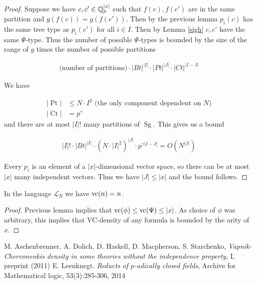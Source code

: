 \documentclass{amsart}
\renewcommand{\LL}{\mathcal L_R}
\DeclareMathOperator{\Sg}{Sg}
\DeclareMathOperator{\Pt}{Pt}
\DeclareMathOperator{\Ct}{Ct}
\begin{document}
\begin{proof}
	Suppose we have $c, c' \in \mathbb{Q}_p^{|x|}$ such that $f(c), f(c')$ are in the same partition and $g(f(c)) = g(f(c'))$.
	Then by the previous lemma $p_i(c)$ has the same tree type as $p_i(c')$ for all $i\in I$.
	Then by Lemma \ref{sigh} $c, c'$ have the same $\Psi$-type.
	Thus the number of possible $\Psi$-types is bounded by the size of the range of $g$ times the number of possible partitions
	
	\begin{align*}
		\text{(number of partitions)} \cdot |Bt|^{|I|} \cdot |Pt|^{|J|} \cdot |Ct|^{|I-J|}
	\end{align*}
	
	We have
	
	\begin{align*}
		|\Pt| &\leq N \cdot I^2 \text { (the only component dependent on $N$)} \\
		|\Ct| &= p^\gamma 
	\end{align*}
	and there are at most ${|I|}!$ many partitions of $\Sg$. 
	This gives us a bound
	
	\begin{align*}
		{|I|}! \cdot |Bt|^{|I|} \cdot (N \cdot {|I|}^2)^{|J|} \cdot p^{\gamma {|I-J|}} = O(N^{|J|})
	\end{align*}	
	
	Every $p_i$ is an element of a $|x|$-dimensional vector space, so there can be at most $|x|$ many independent vectors.
	Thus we have $|J| \leq |x|$ and the bound follows.
\end{proof}

\begin{Corollary}
	In the language $\LL$ we have $\operatorname{vc}(n) = n$.
\end{Corollary}

\begin{proof}
	Previous lemma implies that $\operatorname{vc}(\phi) \leq \operatorname{vc}(\Psi) \leq |x|$.
	As choice of $\phi$ was arbitrary, this implies that VC-density of any formula is bounded by the arity of $x$.
\end{proof}

\begin{thebibliography}{9}
		M. Aschenbrenner, A. Dolich, D. Haskell, D. Macpherson, S. Starchenko,
		\textit{Vapnik-Chervonenkis density in some theories without the independence property}, I, preprint (2011)
		E. Leenknegt. \textit{Reducts of $p$-adically closed fields}, Archive for Mathematical logic, 53(3):285-306, 2014
\end{thebibliography}
\end{document}
